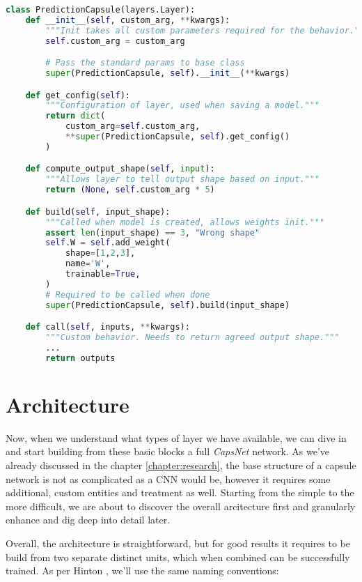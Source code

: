\begin{lstlisting}[language=Python, caption=Custom layer example]
class PredictionCapsule(layers.Layer):
    def __init__(self, custom_arg, **kwargs):
        """Init takes all custom parameters required for the behavior."""
        self.custom_arg = custom_arg

        # Pass the standard params to base class
        super(PredictionCapsule, self).__init__(**kwargs)

    def get_config(self):
        """Configuration of layer, used when saving a model."""
        return dict(
            custom_arg=self.custom_arg,
            **super(PredictionCapsule, self).get_config()
        )

    def compute_output_shape(self, input):
        """Allows layer to tell output shape based on input."""
        return (None, self.custom_arg * 5)

    def build(self, input_shape):
        """Called when model is created, allows weights init."""
        assert len(input_shape) == 3, "Wrong shape"
        self.W = self.add_weight(
            shape=[1,2,3],
            name='W',
            trainable=True,
        )
        # Required to be called when done
        super(PredictionCapsule, self).build(input_shape)

    def call(self, inputs, **kwargs):
        """Custom behavior. Needs to return agreed output shape."""
        ...
        return outputs

\end{lstlisting}


\section{Architecture}

Now, when we understand what types of layer we have available, we can dive in and start building from these basic blocks a full \textit{CapsNet} network. As we've already discussed in the chapter \ref{chapter:research}, the base structure of a capsule network is not as complicated as a CNN would be, however it requires some additional, custom entities and treatment as well. Starting from the simple to the more difficult, we are about to discover the overall arcitecture first and granularly enhance and dig deep into detail later.

Overall, the architecture is straightforward, but for good results it requires to be build from two separate distinct units, which when combined can be successfully trained. As per Hinton \cite{capsule}, we'll use the same naming conventions:

